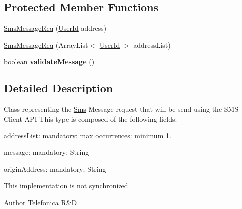 \subsection*{Protected Member Functions}
\begin{DoxyCompactItemize}
\item 
\hyperlink{classcom_1_1bluevia_1_1messagery_1_1mt_1_1sms_1_1data_1_1SmsMessageReq_a00ba2d867c457d7a823d60447daa063f}{SmsMessageReq} (\hyperlink{classcom_1_1bluevia_1_1commons_1_1data_1_1UserId}{UserId} address)
\item 
\hyperlink{classcom_1_1bluevia_1_1messagery_1_1mt_1_1sms_1_1data_1_1SmsMessageReq_a25aae91e400e1ffd9d8a6ee5901fba03}{SmsMessageReq} (ArrayList$<$ \hyperlink{classcom_1_1bluevia_1_1commons_1_1data_1_1UserId}{UserId} $>$ addressList)
\item 
\hypertarget{classcom_1_1bluevia_1_1messagery_1_1mt_1_1sms_1_1data_1_1SmsMessageReq_a053456d7f967bb996ec5587e96ed2623}{
boolean {\bfseries validateMessage} ()}
\label{classcom_1_1bluevia_1_1messagery_1_1mt_1_1sms_1_1data_1_1SmsMessageReq_a053456d7f967bb996ec5587e96ed2623}

\end{DoxyCompactItemize}


\subsection{Detailed Description}
Class representing the \hyperlink{classcom_1_1bluevia_1_1messagery_1_1mt_1_1sms_1_1data_1_1Sms}{Sms} Message request that will be send using the SMS Client API This type is composed of the following fields: 
\begin{DoxyItemize}
\item addressList: mandatory; max occurrences: minimum 1. 
\item message: mandatory; String 
\item originAddress: mandatory; String 
\end{DoxyItemize}

This implementation is not synchronized

\begin{DoxyAuthor}{Author}
Telefonica R\&D 
\end{DoxyAuthor}


